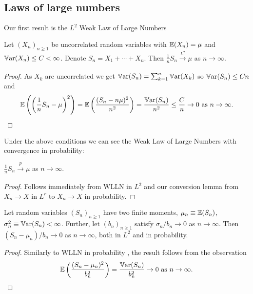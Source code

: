 \documentclass[10pt, a4paper]{article}
\begin{document}
\subsection{Laws of large numbers}

Our first result is the $L ^ 2$ Weak Law of Large Numbers
\begin{theorem}
    Let $(X_n)_{n \geq 1}$ be uncorrelated random variables with $\mathbb{E}(X_n) = \mu$ and $\mathbb{V}\mathrm{ar}(X_n) \leq C < \infty$.
    Denote $S_n = X_1 + \dotsi + X_n$.
    Then $\frac{1}{n}S_n \xrightarrow[]{L ^ 2} \mu$ as $n \to \infty$.

    \begin{proof}
        As $X_k$ are uncorrelated we get $\mathbb{V}\mathrm{ar}(S_n) = \sum_{k = 1}^{n}\mathbb{V}\mathrm{ar}(X_k)$ so $\mathbb{V}\mathrm{ar}(S_n) \leq Cn$ and
        \[
        \mathbb{E}\left(\left(\frac{1}{n}S_n - \mu\right) ^ 2\right) = \mathbb{E}\left(\frac{(S_n - n\mu) ^ 2}{n ^ 2}\right) = \frac{\mathbb{V}\mathrm{ar}(S_n)}{n ^ 2} \leq \frac{C}{n} \to 0\text{ as } n \to \infty.
        \]
    \end{proof}
\end{theorem}

Under the above conditions we can see the Weak Law of Large Numbers with convergence in probability:
\begin{theorem}
    $\frac{1}{n}S_n \xrightarrow[]{p} \mu$ as $n \to \infty$.

    \begin{proof}
        Follows immediately from WLLN in $L ^ 2$ and our conversion lemma from $X_n \to X$ in $L ^ r$ to $X_n \to X$ in probability.
    \end{proof}
\end{theorem}

\begin{lemma}
    Let random variables $(S_n)_{n \geq 1}$ have two finite moments,
    $\mu_n \equiv \mathbb{E}(S_n)$,
    $\sigma_n ^ 2 \equiv \mathbb{V}\mathrm{ar}(S_n) < \infty$.
    Further,
    let $(b_n)_{n \geq 1}$ satisfy $\sigma_n / b_n \to 0$ as $n \to \infty$.
    Then $(S_n - \mu_n) / b_n \to 0$ as $n \to \infty$,
    both in $L ^ 2$ and in probability.

    \begin{proof}
        Similarly to WLLN in probability ,
        the result follows from the observation
        \[
        \mathbb{E}\left(\frac{(S_n - \mu_n) ^ 2}{b_n ^ 2}\right) = \frac{\mathbb{V}\mathrm{ar}(S_n)}{b_n ^ 2} \to 0\text{ as } n \to \infty.
        \]
    \end{proof}
\end{lemma}
\end{document}
